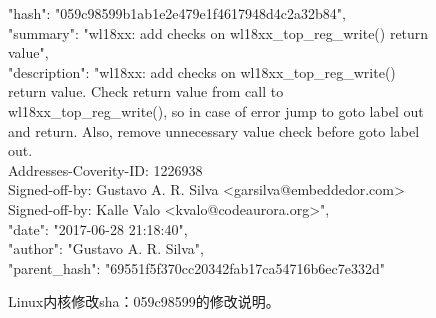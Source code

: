 \begin{figure}[b]
	\centering
	\begin{minipage}{0.75\linewidth}
{\footnotesize	
"hash": "059c98599b1ab1e2e479e1f4617948d4c2a32b84",\\
"summary": "wl18xx: add checks on wl18xx\_top\_reg\_write() return value",\\
"description": 
"wl18xx: add checks on wl18xx\_top\_reg\_write() return value.
Check return value from call to wl18xx\_top\_reg\_write(),
so in case of error jump to goto label out and return.
Also, remove unnecessary value check before goto label out.\\
Addresses-Coverity-ID: 1226938\\
Signed-off-by: Gustavo A. R. Silva <garsilva@embeddedor.com>\\
Signed-off-by: Kalle Valo <kvalo@codeaurora.org>",\\
"date": "2017-06-28 21:18:40",\\
"author": "Gustavo A. R. Silva",\\
"parent\_hash": "69551f5f370cc20342fab17ca54716b6ec7e332d"	
}
	\end{minipage}
	\caption{
	Linux内核修改sha：059c98599的修改说明。
	}
	\label{fig:2-3-description}
\end{figure}